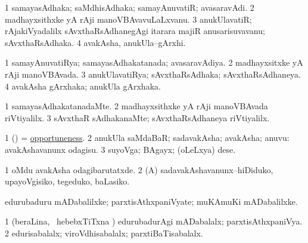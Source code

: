 \bentry
{}
\gl{\nA}
\bmng
\bnum
\num{1} samayasAdhaka; saMdhisAdhaka; samayAnuvatiR; avasaravAdi. 
\num{2} madhayxsithxke yA rAji manoVBAvavuLaLxvanu. 
\num{3} anukUlavatiR; rAjakiVyadalilx sAvxthaRsAdhanegAgi itarara majiR anusarisuvavanu; sAvxthaRsAdhaka. 
\num{4} avakAsha, anukUla--gArxhi. 
\enum
\emng
\eentry

\bentry
{}
\gl{\gu}
\bmng
\bnum
\num{1} samayAnuvatiRya; samayasAdhakatanada; avasaravAdiya. 
\num{2} madhayxsitxke yA rAji manoVBAvada. 
\num{3} anukUlavatiRya; sAvxthaRsAdhaka; sAvxthaRsAdhaneya. 
\num{4} avakAsha gArxhaka; anukUla gArxhaka. 
\enum
\emng
\eentry

\bentry
{}
\gl{\kirxvi}
\bmng
\bnum
\num{1} samayasAdhakatanadaMte. 
\num{2} madhayxsithxke yA rAji manoVBAvada riVtiyalilx. 
\num{3} sAvxthaR sAdhakanaMte; sAvxthaRsAdhaneya riVtiyalilx. 
\enum
\emng
\eentry

\bentry
{}
\gl{\nA}
\bmng
\bnum
\num{1} (\viparx) = \hyperlink{opportuneness}{opportuneness}. 
\num{2} anukUla saMdaBaR; sadavakAsha; avakAsha; anuvu:  avakAshavanunx odagisu. 
\num{3} suyoVga; BAgayx; (oLeLxya) dese. 
\enum
\emng

\noindent
\gl{\pagu}
\bmng
\bnum
\num{1}  oMdu avakAsha odagibarutatxde. 
\num{2}  (A) sadavakAshavanunx--hiDiduko, upayoVgisiko, tegeduko, baLasiko. 
\enum
\emng
\eentry

\bentry
{}
\gl{\nA}
\bmng
edurubaduru mADabalilxke; parxtisAthxpaniVyate; muKAmuKi mADabalilxke. 
\emng
\eentry

\bentry
{}
\gl{\gu}
\bmng
\bnum
\num{1} (beraLina, \kanmu\ hebebxTiTxna \vi) edurubadurAgi mADabalalx; parxtisAthxpaniVya. 
\num{2} edurisabalalx; viroVdhisabalalx; parxtiBaTisabalalx. 
\enum
\emng
\eentry

